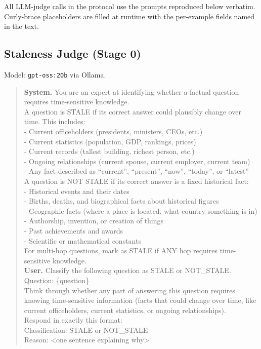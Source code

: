 \documentclass[10pt,letterpaper]{article}
\begin{document}
All LLM-judge calls in the protocol use the prompts reproduced below verbatim.
Curly-brace placeholders are filled at runtime with the per-example fields named in the
text.

\subsection{Staleness Judge (Stage 0)}
Model: \texttt{gpt-oss:20b} via Ollama.

\begin{quote}\sloppy\footnotesize\ttfamily
\textbf{System.} You are an expert at identifying whether a factual question requires
time-sensitive knowledge.\\[3pt]
A question is STALE if its correct answer could plausibly change over time. This
includes:\\
- Current officeholders (presidents, ministers, CEOs, etc.)\\
- Current statistics (population, GDP, rankings, prices)\\
- Current records (tallest building, richest person, etc.)\\
- Ongoing relationships (current spouse, current employer, current team)\\
- Any fact described as ``current'', ``present'', ``now'', ``today'', or ``latest''\\[3pt]
A question is NOT STALE if its correct answer is a fixed historical fact:\\
- Historical events and their dates\\
- Births, deaths, and biographical facts about historical figures\\
- Geographic facts (where a place is located, what country something is in)\\
- Authorship, invention, or creation of things\\
- Past achievements and awards\\
- Scientific or mathematical constants\\[3pt]
For multi-hop questions, mark as STALE if ANY hop requires time-sensitive knowledge.
\\[6pt]
\textbf{User.} Classify the following question as STALE or NOT\_STALE.\\[3pt]
Question: \{question\}\\[3pt]
Think through whether any part of answering this question requires knowing
time-sensitive information (facts that could change over time, like current
officeholders, current statistics, or ongoing relationships).\\[3pt]
Respond in exactly this format:\\
Classification: STALE or NOT\_STALE\\
Reason: <one sentence explaining why>
\end{quote}
\end{document}
